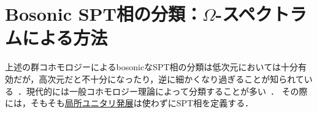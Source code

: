 \documentclass[TQFT_main]{subfiles}
\begin{document}
\section{Bosonic SPT相の分類：$\Omega$-スペクトラムによる方法}

上述の群コホモロジーによるbosonicなSPT相の分類は低次元においては十分有効だが，高次元だと不十分になったり，逆に細かくなり過ぎることが知られている~\cite{Kapustin2014SPT}．現代的には一般コホモロジー理論によって分類することが多い~\cite{Xiong2019SPT}．
その際には，そもそも\hyperref[prop:LU]{局所ユニタリ発展}は使わずにSPT相を定義する．
\end{document}
